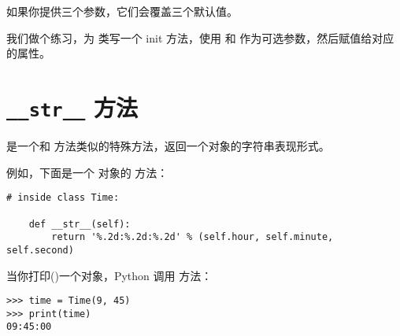 %

如果你提供三个参数，它们会覆盖三个默认值。


我们做个练习，为  类写一个 init 方法，使用  和  作为可选参数，然后赋值给对应的属性。
  


\section{ {\tt \_\_str\_\_} 方法}

  


 是一个和 
方法类似的特殊方法，返回一个对象的字符串表现形式。



例如，下面是一个  对象的  方法：

\begin{lstlisting}
# inside class Time:

    def __str__(self):
        return '%.2d:%.2d:%.2d' % (self.hour, self.minute, self.second)
\end{lstlisting}

%

当你打印()一个对象，Python 调用  方法：

  

\begin{lstlisting}
>>> time = Time(9, 45)
>>> print(time)
09:45:00
\end{lstlisting}

%

